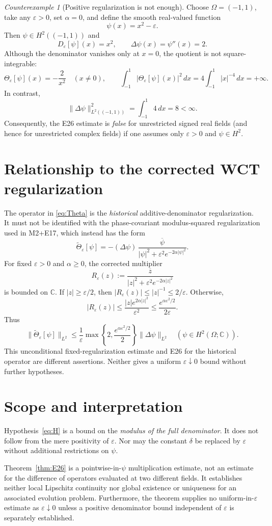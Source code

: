 \documentclass[11pt]{article}
\theoremstyle{remark}
\newtheorem{counterexample}{Counterexample}
\begin{document}
\begin{counterexample}[Positive regularization is not enough]
Choose $\Omega=(-1,1)$, take any $\varepsilon>0$, set $\alpha=0$,
and define the smooth real-valued function
\[
\psi(x)=x^2-\varepsilon.
\]
Then $\psi\in H^2((-1,1))$ and
\[
D_\varepsilon[\psi](x)=x^2,
\qquad
\Delta\psi(x)=\psi''(x)=2.
\]
Although the denominator vanishes only at $x=0$, the quotient is not
square-integrable:
\[
\Theta_\varepsilon[\psi](x)=-\frac{2}{x^2}
\quad(x\ne0),
\qquad
\int_{-1}^{1}|\Theta_\varepsilon[\psi](x)|^2\,dx
=4\int_{-1}^{1}|x|^{-4}\,dx=+\infty.
\]
In contrast,
\[
\bigl\|\Delta\psi\bigr\|_{L^2((-1,1))}^2
=\int_{-1}^{1}4\,dx=8<\infty.
\]
Consequently, the E26 estimate is \emph{false} for unrestricted
signed real fields (and hence for unrestricted complex fields) if
one assumes only $\varepsilon>0$ and $\psi\in H^2$.
\end{counterexample}

\section{Relationship to the corrected WCT regularization}
The operator in \eqref{eq:Theta} is the \emph{historical}
additive-denominator regularization. It must not be identified with
the phase-covariant modulus-squared regularization used in
M2+E17, which instead has the form
\[
\widetilde\Theta_\varepsilon[\psi]
=-(\Delta\psi)\,
\frac{\overline\psi}{|\psi|^2+
\varepsilon^2e^{-2\alpha|\psi|^2}}.
\]
For fixed $\varepsilon>0$ and $\alpha\geq0$, the corrected multiplier
\[
R_\varepsilon(z):=
\frac{\overline z}{|z|^2+\varepsilon^2e^{-2\alpha|z|^2}}
\]
is bounded on $\mathbb C$. If $|z|\geq\varepsilon/2$, then
$|R_\varepsilon(z)|\leq |z|^{-1}\leq2/\varepsilon$. Otherwise,
\[
|R_\varepsilon(z)|
\leq\frac{|z|e^{2\alpha|z|^2}}{\varepsilon^2}
\leq\frac{e^{\alpha\varepsilon^2/2}}{2\varepsilon}.
\]
Thus
\[
\|\widetilde\Theta_\varepsilon[\psi]\|_{L^2}
\leq\frac{1}{\varepsilon}
\max\left\{2,\frac{e^{\alpha\varepsilon^2/2}}{2}\right\}
\|\Delta\psi\|_{L^2}
\quad(\psi\in H^2(\Omega;\mathbb C)).
\]
This unconditional fixed-regularization estimate and E26
for the historical operator are different assertions. Neither gives
a uniform $\varepsilon\downarrow0$ bound without further hypotheses.

\section{Scope and interpretation}
Hypothesis~\eqref{eq:H} is a bound on the \emph{modulus of the full
denominator}. It does not follow from the mere positivity of
$\varepsilon$. Nor may the constant $\delta$ be replaced by
$\varepsilon$ without additional restrictions on $\psi$.

Theorem~\ref{thm:E26} is a pointwise-in-$\psi$ multiplication estimate,
not an estimate for the difference of operators evaluated at two
different fields. It establishes neither local Lipschitz continuity
nor global existence or uniqueness for an associated evolution
problem. Furthermore, the theorem supplies no uniform-in-$\varepsilon$
estimate as $\varepsilon\downarrow0$ unless a positive denominator
bound independent of $\varepsilon$ is separately established.
\end{document}
